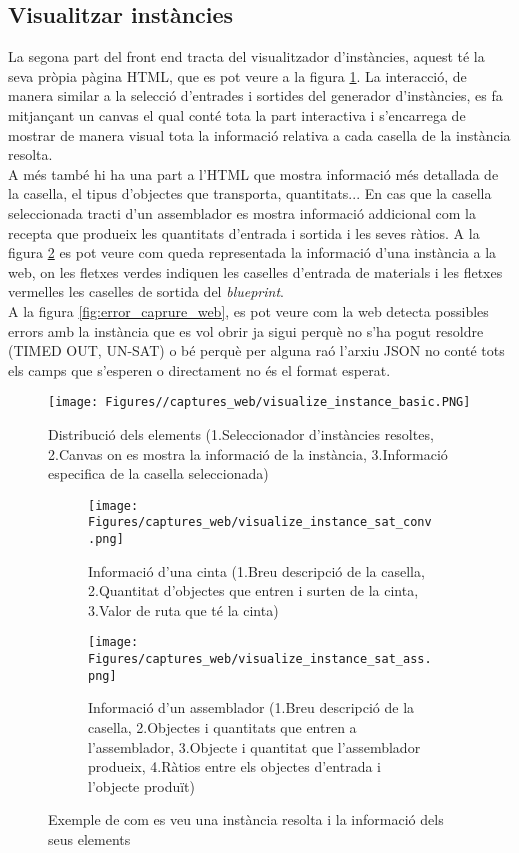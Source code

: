 \subsection{Visualitzar instàncies}
La segona part del front end tracta del visualitzador d'instàncies, aquest té la seva pròpia pàgina HTML, que es pot veure a la figura \ref{fig:visualize_basic}. La interacció, de manera similar a la selecció d'entrades i sortides del generador d'instàncies, es fa mitjançant un canvas el qual conté tota la part interactiva i s'encarrega de mostrar de manera visual tota la informació relativa a cada casella de la instància resolta.\\
A més també hi ha una part a l'HTML que mostra informació més detallada de la casella, el tipus d'objectes que transporta, quantitats... En cas que la casella seleccionada tracti d'un assemblador es mostra informació addicional com la recepta que produeix les quantitats d'entrada i sortida i les seves ràtios. A la figura \ref{fig:solved_instance_web} es pot veure com queda representada la informació d'una instància a la web, on les fletxes verdes indiquen les caselles d'entrada de materials i les fletxes vermelles les caselles de sortida del \textit{blueprint}.\\
A la figura \ref{fig:error_caprure_web}, es pot veure com la web detecta possibles errors amb la instància que es vol obrir ja sigui perquè no s'ha pogut resoldre (TIMED OUT, UN-SAT) o bé perquè per alguna raó l'arxiu JSON no conté tots els camps que s'esperen o directament no és el format esperat.

\begin{figure}[H]
    \centering
    \texttt{[image: Figures//captures\_web/visualize\_instance\_basic.PNG]}
    \caption{Distribució dels elements (1.Seleccionador d'instàncies resoltes, 2.Canvas on es mostra la informació de la instància, 3.Informació especifica de la casella seleccionada)}
    \label{fig:visualize_basic}
\end{figure}


\begin{figure}[H]
    \centering
    \begin{subfigure}{0.45\textwidth}
        \texttt{[image: Figures/captures\_web/visualize\_instance\_sat\_conv.png]}
        \caption{Informació d'una cinta (1.Breu descripció de la casella, 2.Quantitat d'objectes que entren i surten de la cinta, 3.Valor de ruta que té la cinta)}
    \end{subfigure}
    \hfill
    \begin{subfigure}{0.45\textwidth}
        \texttt{[image: Figures/captures\_web/visualize\_instance\_sat\_ass.png]}
        \caption{Informació d'un assemblador (1.Breu descripció de la casella, 2.Objectes i quantitats que entren a l'assemblador, 3.Objecte i quantitat que l'assemblador produeix, 4.Ràtios entre els objectes d'entrada i l'objecte produït)}
    \end{subfigure}
    \caption{Exemple de com es veu una instància resolta i la informació dels seus elements}
    \label{fig:solved_instance_web}
\end{figure}

